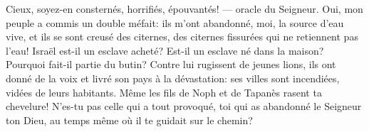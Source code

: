 Cieux, soyez-en consternés, horrifiés, épouvantés! --- oracle du Seigneur.
Oui, mon peuple a commis un double méfait:
	ils m’ont abandonné, moi, la source d’eau vive,
	et ils se sont creusé des citernes,
		des citernes fissurées qui ne retiennent pas l’eau!
Israël est-il un esclave acheté?
	Est-il un esclave né dans la maison? Pourquoi fait-il partie du butin?
Contre lui rugissent de jeunes lions,
	ils ont donné de la voix et livré son pays à la dévastation:
	ses villes sont incendiées, vidées de leurs habitants.
Même les fils de Noph et de Tapanès rasent ta chevelure!
N’es-tu pas celle qui a tout provoqué,
	toi qui as abandonné le Seigneur ton Dieu,
	au temps même où il te guidait sur le chemin?
